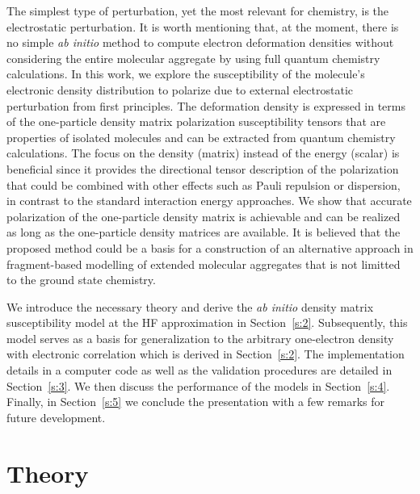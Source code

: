 \documentclass[aip,amsmath,amssymb,reprint,floatfix]{revtex4-1}
\begin{document}
The simplest type of perturbation, yet the most relevant for chemistry, 
is the electrostatic perturbation.
It is worth mentioning that, at the moment, there is no simple \emph{ab initio}
method to compute electron deformation densities without considering the entire molecular 
aggregate by using full quantum chemistry calculations.\cite{Horn.Head-Gordon.JCP.2015,
Mandado.Hermida-Ramon.JCTC.2011}
In this work, we explore the susceptibility of the molecule's electronic density distribution
to polarize due to external electrostatic perturbation from first principles. 
The deformation density is expressed in terms
of the one\hyp{}particle density matrix polarization susceptibility tensors 
that are properties of isolated molecules and can be
extracted from quantum chemistry calculations. The focus on the density (matrix) instead of the energy
(scalar) is beneficial since it provides the directional tensor description
of the polarization that could be combined with other effects such as Pauli repulsion 
or dispersion,\cite{Mandado.Hermida-Ramon.JCTC.2011}
in contrast to the standard interaction energy approaches. We show that accurate polarization 
of the one\hyp{}particle density
matrix is achievable and can be realized as long as the one\hyp{}particle density matrices
are available. It is believed that the proposed method
could be a basis for a construction of an 
alternative approach in fragment\hyp{}based
modelling of extended molecular aggregates that is not limitted to the ground state chemistry.

We introduce the necessary theory and derive the \emph{ab initio} density matrix susceptibility model
at the HF approximation\cite{Roothaan.RevModPhys.1951} 
in Section~\ref{s:2}. Subsequently, this model serves as a basis for generalization to the 
arbitrary one\hyp{}electron density with electronic correlation which is derived in Section~\ref{s:2}. 
The implementation details in a computer code as well as the validation procedures are detailed
in Section~\ref{s:3}. We then discuss the performance of the models in Section~\ref{s:4}.
Finally, in Section~\ref{s:5} we conclude the presentation with a few 
remarks for future development.

\section{\label{s:2}Theory}
\end{document}
